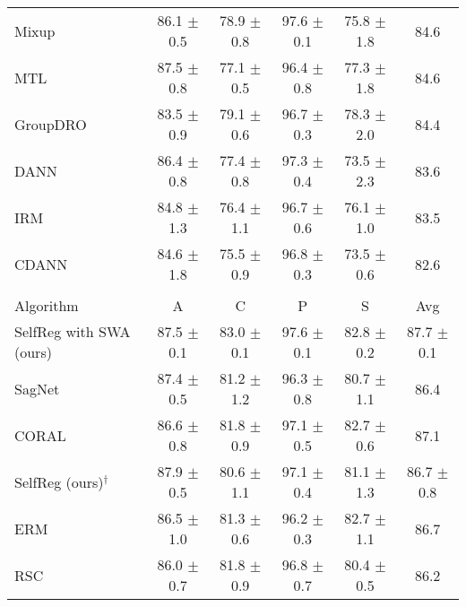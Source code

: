 \documentclass[10pt,twocolumn,letterpaper]{article}
\begin{document}
\begin{table*}[ht]
\begin{center}
{\begin{tabular}{lccccc}
Mixup~\cite{yan2020improve}                & 86.1 $\pm$ 0.5       & 78.9 $\pm$ 0.8       & 97.6 $\pm$ 0.1       & 75.8 $\pm$ 1.8       & 84.6                 \\
MTL~\cite{blanchard2017domain}                  & 87.5 $\pm$ 0.8       & 77.1 $\pm$ 0.5       & 96.4 $\pm$ 0.8       & 77.3 $\pm$ 1.8       & 84.6                 \\
GroupDRO~\cite{sagawa2019distributionally}             & 83.5 $\pm$ 0.9       & 79.1 $\pm$ 0.6       & 96.7 $\pm$ 0.3       & 78.3 $\pm$ 2.0       & 84.4        \\
DANN~\cite{ganin2016domain}                 & 86.4 $\pm$ 0.8       & 77.4 $\pm$ 0.8       & 97.3 $\pm$ 0.4       & 73.5 $\pm$ 2.3       & 83.6                 \\
IRM~\cite{arjovsky2019invariant}                  & 84.8 $\pm$ 1.3       & 76.4 $\pm$ 1.1       & 96.7 $\pm$ 0.6       & 76.1 $\pm$ 1.0       & 83.5                 \\
CDANN~\cite{li2018deep}                & 84.6 $\pm$ 1.8       & 75.5 $\pm$ 0.9       & 96.8 $\pm$ 0.3       & 73.5 $\pm$ 0.6       & 82.6                 \\
\toprule
\rowcolor{Gray}
\multicolumn{6}{c}{Model selection: test-domain validation set (oracle)} \\ \midrule
Algorithm   & A       & C       & P         & S         & Avg\\ \midrule
SelfReg with SWA (ours)     & 87.5 $\pm$ 0.1     & 83.0 $\pm$ 0.1     & 97.6 $\pm$ 0.1      & 82.8 $\pm$ 0.2    & 87.7 $\pm$ 0.1     \\ \midrule
SagNet~\cite{nam2019reducing}               & 87.4 $\pm$ 0.5       & 81.2 $\pm$ 1.2       & 96.3 $\pm$ 0.8       & 80.7 $\pm$ 1.1       & 86.4                 \\
CORAL~\cite{sun2016deep}                & 86.6 $\pm$ 0.8       & 81.8 $\pm$ 0.9       & 97.1 $\pm$ 0.5       & 82.7 $\pm$ 0.6       & 87.1                 \\
SelfReg (ours)$^{\dagger}$       & 87.9 $\pm$ 0.5	    & 80.6 $\pm$ 1.1	       & 97.1 $\pm$ 0.4 	& 81.1 $\pm$ 1.3    & 86.7 $\pm$ 0.8 \\ 
ERM~\cite{vapnik1999overview}       & 86.5 $\pm$ 1.0       & 81.3 $\pm$ 0.6       & 96.2 $\pm$ 0.3       & 82.7 $\pm$ 1.1       & 86.7 \\ 
RSC~\cite{huangRSC2020}                  & 86.0 $\pm$ 0.7       & 81.8 $\pm$ 0.9       & 96.8 $\pm$ 0.7       & 80.4 $\pm$ 0.5       & 86.2                 \\

\end{tabular}}
\end{center}
\end{table*}
\end{document}
